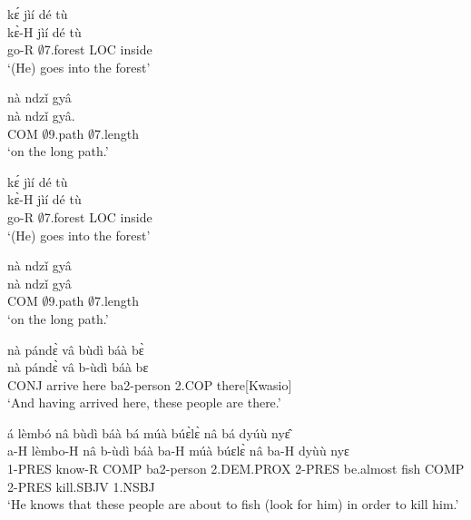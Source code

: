 \begin{exe} 
\exA\label{21}
  \glll   kɛ́ jìí dé tù \\
         kɛ̀-H jìí dé tù  \\
         go-R $\emptyset$7.forest LOC inside        \\
    \trans `(He) goes into the forest'
\end{exe}

\begin{exe} 
\exA\label{22}
  \glll  nà ndzǐ gyâ    \\
      nà ndzǐ gyâ.   \\
          COM $\emptyset$9.path $\emptyset$7.length       \\
    \trans `on the long path.'
\end{exe}

\begin{exe} 
\exA\label{23}
  \glll   kɛ́ jìí dé tù  \\
         kɛ̀-H jìí dé tù  \\
         go-R $\emptyset$7.forest LOC inside        \\
    \trans `(He) goes into the forest'
\end{exe}


\begin{exe} 
\exA\label{24}
  \glll   nà ndzǐ gyâ \\
          nà ndzǐ gyâ \\
      COM $\emptyset$9.path $\emptyset$7.length   \\
    \trans `on the long path.'
\end{exe}

\begin{exe} 
\exA\label{24a}
  \glll   nà pándɛ̀ vâ bùdì báà bɛ̀ \\
          nà pándɛ̀ vâ b-ùdì báà bɛ \\
      CONJ arrive here ba2-person 2.COP there[Kwasio]   \\
    \trans `And having arrived here, these people are there.'
\end{exe}

\begin{exe} 
\exA\label{24b}
  \glll   á lèmbó nâ bùdì báà bá múà búɛ̀lɛ̀ nâ bá dyúù nyɛ̂  \\
          a-H lèmbo-H nâ b-ùdì báà ba-H múà búɛlɛ̀ nâ ba-H dyùù nyɛ  \\
1-PRES know-R COMP ba2-person 2.DEM.PROX 2-PRES be.almost fish COMP 2-PRES kill.SBJV 1.NSBJ   \\
    \trans `He knows that these people are about to fish (look for him) in order to kill him.'
\end{exe}

